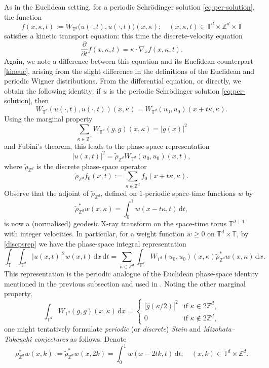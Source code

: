 \documentclass[10pt,a4paper]{amsart}
\numberwithin{equation}{section}
\newcommand{\dd}{\,\mathrm{d}}
\renewcommand{\geq}{\geqslant}
\begin{document}
As in the Euclidean setting, for a periodic Schr\"{o}dinger solution
\eqref{eq:per-solution}, the function
\[ f(x,\kappa,t) := W_{\mathbb{T}^d}\bigl(u(\cdot,t),u(\cdot,t)\bigr)(x,\kappa);\quad (x,\kappa,t)\in\mathbb{T}^d\times\mathbb{Z}^d\times\mathbb{T} \]
satisfies a kinetic transport equation: this time the discrete-velocity equation
\begin{equation*}%
\frac{\partial}{\partial t}f(x,\kappa,t) = \kappa\cdot\nabla_x f(x,\kappa,t).
\end{equation*}
Again, we note a difference between this equation and its Euclidean counterpart \eqref{kineuc}, arising from the slight difference in the definitions of the Euclidean and periodic Wigner distributions. 
From the differential equation, or directly, we obtain the following identity: if $u$ is the periodic Schr\"{o}dinger solution \eqref{eq:per-solution}, then
\[ W_{\mathbb{T}^d}(u(\cdot,t),u(\cdot,t))(x,\kappa)
=W_{\mathbb{T}^d}(u_0,u_0)(x+t\kappa,\kappa). \]
Using the marginal property
\[ \sum_{\kappa\in\mathbb{Z}^d}W_{\mathbb{T}^d}(g,g)(x,\kappa)=|g(x)|^2 \]
and Fubini's theorem,
this leads to the phase-space representation
\begin{equation}\label{discpsrep}
|u(x,t)|^2=\widetilde{\rho}_{\mathbb{Z}^{d}}W_{\mathbb{T}^d}(u_0,u_0)(x,t),
\end{equation}
where $\widetilde{\rho}_{\mathbb{Z}^d}$ is the discrete phase-space operator
\[ \widetilde{\rho}_{\mathbb{Z}^d}f_0(x,t):=\sum_{\kappa\in\mathbb{Z}^d}f_0(x+t\kappa,\kappa). \]
Observe that the adjoint of $\widetilde{\rho}_{\mathbb{Z}^d}$, defined on $1$-periodic space-time functions $w$ by
\begin{equation*}%
\widetilde{\rho}^{\ast}_{\mathbb{Z}^d}w(x,\kappa)=\int_0^1w(x-t\kappa,t)\dd t,
\end{equation*}
is now a (normalised) geodesic X-ray transform on the space-time torus $\mathbb{T}^{d+1}$ with integer velocities.
In particular, for a weight function $w\geq0$ on $\mathbb{T}^d\times\mathbb{T}$, by \eqref{discpsrep} we have the phase-space integral representation
\[ \int_{\mathbb{T}} \int_{\mathbb{T}^d} |u(x,t)|^2w(x,t)\dd x\dd t
= \sum_{\kappa\in\mathbb{Z}^d}\int_{\mathbb{T}^d} W_{\mathbb{T}^d}(u_0,u_0)(x,\kappa)\widetilde{\rho}^{\ast}_{\mathbb{Z}^d}w(x,\kappa)\dd x. \]
This representation is the periodic analogue of the Euclidean phase-space identity mentioned in the previous subsection and used in \cite{BGNO}.
Noting the other marginal property,
\[ \int_{\mathbb{T}^d}W_{\mathbb{T}^d}(g,g)(x,\kappa)\dd x
= \begin{cases}
|\widehat{g}(\kappa/2)|^2 & \text{if } \kappa\in 2\mathbb{Z}^d, \\ 
0 & \text{if } \kappa\not\in 2\mathbb{Z}^d,
\end{cases} \]
one might tentatively formulate \emph{periodic} (or \emph{discrete}) \emph{Stein} and \emph{Mizohata--Takeuchi conjectures} as follows.
Denote
\[ \rho^{\ast}_{\mathbb{Z}^d}w(x,k) := \widetilde{\rho}^{\ast}_{\mathbb{Z}^d}w(x,2k) = \int_0^1 w(x-2tk,t)\dd t; \quad (x,k)\in\mathbb{T}^d\times\mathbb{Z}^d. \]
\end{document}
